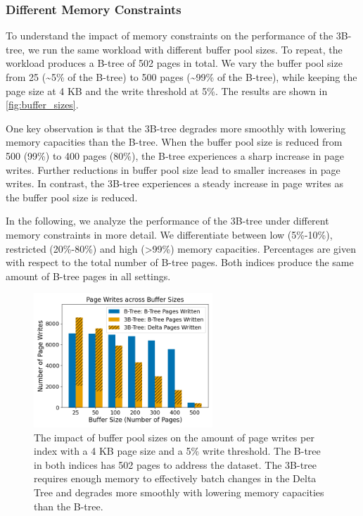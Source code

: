 \subsubsection*{Different Memory Constraints}
To understand the impact of memory constraints on the performance of the 3B-tree, we run the same workload with different buffer pool sizes.
To repeat, the workload produces a B-tree of 502 pages in total. We vary the buffer pool size from 25 (\textasciitilde5\% of the B-tree) to 500 pages (\textasciitilde99\% of the B-tree), while keeping the page size at 4 KB and the write threshold at 5\%.
The results are shown in \autoref{fig:buffer_sizes}.

One key observation is that the 3B-tree degrades more smoothly with lowering memory capacities than the B-tree.
When the buffer pool size is reduced from 500 (99\%) to 400 pages (80\%), the B-tree experiences a sharp increase in page writes.
Further reductions in buffer pool size lead to smaller increases in page writes.
In contrast, the 3B-tree experiences a steady increase in page writes as the buffer pool size is reduced.

In the following, we analyze the performance of the 3B-tree under different memory constraints in more detail.
We differentiate between low (5\%-10\%), restricted (20\%-80\%) and high (>99\%) memory capacities.
Percentages are given with respect to the total number of B-tree pages.
Both indices produce the same amount of B-tree pages in all settings.

\begin{figure}[htbp]
  \centering
  \includegraphics[width=0.6\textwidth]{figures/evaluation/pageviews_buffer_sizes.png}
  \caption{The impact of buffer pool sizes on the amount of page writes per index with a 4 KB page size and a 5\% write threshold.
  The B-tree in both indices has 502 pages to address the dataset.
  The 3B-tree requires enough memory to effectively batch changes in the Delta Tree and degrades more smoothly with lowering memory capacities than the B-tree.}
  \label{fig:buffer_sizes}
\end{figure}

